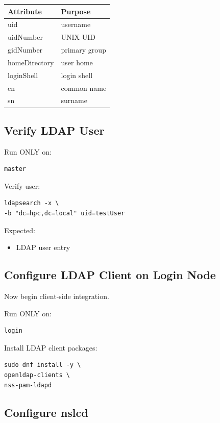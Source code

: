 \documentclass[11pt]{article}
\begin{document}
\begin{center}
\begin{tabular}{ll}
Attribute & Purpose\\
\hline
uid & username\\
uidNumber & UNIX UID\\
gidNumber & primary group\\
homeDirectory & user home\\
loginShell & login shell\\
cn & common name\\
sn & surname\\
\end{tabular}
\end{center}
\subsection{Verify LDAP User}
\label{sec:orga6f1ce9}

Run ONLY on:

\begin{verbatim}
master
\end{verbatim}

Verify user:

\begin{verbatim}
ldapsearch -x \
-b "dc=hpc,dc=local" uid=testUser
\end{verbatim}

Expected:
\begin{itemize}
\item LDAP user entry
\end{itemize}
\subsection{Configure LDAP Client on Login Node}
\label{sec:org5808567}

Now begin client-side integration.

Run ONLY on:

\begin{verbatim}
login
\end{verbatim}

Install LDAP client packages:

\begin{verbatim}
sudo dnf install -y \
openldap-clients \
nss-pam-ldapd
\end{verbatim}
\subsection{Configure nslcd}
\label{sec:orgedd0221}
\end{document}
